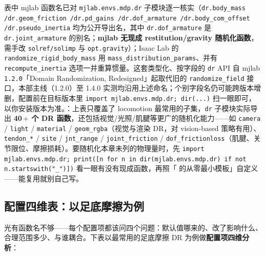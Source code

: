 \begin{finenote}
表中 mjlab 函数名已对 \texttt{mjlab.\allowbreak envs.\allowbreak mdp.\allowbreak dr} 子模块逐一核实（\texttt{dr.\allowbreak body\_mass /\allowbreak  dr.\allowbreak geom\_friction /\allowbreak  dr.\allowbreak pd\_gains /\allowbreak  dr.\allowbreak dof\_armature /\allowbreak  dr.\allowbreak body\_com\_offset /\allowbreak  dr.\allowbreak pseudo\_inertia} 均为公开导出名，其中 \texttt{dr.\allowbreak dof\_armature} 是 \texttt{dr.\allowbreak joint\_armature} 的别名；\textbf{mjlab 无现成 restitution/gravity 随机化函数}，需手改 \texttt{solref/\allowbreak solimp} 与 \texttt{opt.gravity}）；Isaac Lab 的 \texttt{randomize\_rigid\_body\_mass} 用 \texttt{mass\_distribution\_params}、并有 \texttt{recompute\_inertia} 选项一并重算惯量。这套类型化、按字段的 \texttt{dr} API 自 mjlab \texttt{1.2.0}「Domain Randomization, Redesigned」起取代旧的 \texttt{randomize\_field} 接口，本部主线（1.2.0）至 1.4.0 实测均沿用上述命名；个别字段名仍可能跨版本增删，配置前在目标版本里 \texttt{import mjlab.\allowbreak envs.\allowbreak mdp.\allowbreak dr; dir(...)} 扫一眼即可，以你安装版本为准。：上表只覆盖了 locomotion 最常用的子集，\texttt{dr} 子模块实际导出\textbf{ 40\,$+$ 个 DR 函数}，还包括视觉/光照/肌腱等更广的随机化能力——如 \texttt{camera} / \texttt{light} / \texttt{material} / \texttt{geom\_rgba}（视觉与渲染 DR，对 vision-based 策略有用）、\texttt{tendon\_*} / \texttt{site} / \texttt{jnt\_range} / \texttt{joint\_friction} / \texttt{dof\_frictionloss}（肌腱、关节限位、摩擦损耗）。要随机化本章未列的物理量时，先 \texttt{import mjlab.\allowbreak envs.\allowbreak mdp.\allowbreak dr; print([n for n in dir(mjlab.\allowbreak envs.\allowbreak mdp.\allowbreak dr) if not n.\allowbreak startswith("\_")])} 看一眼有没有现成函数，再照「 的从零最小模板」自定义——能复用就别自己写。
\end{finenote}

\subsection{配置四维表：以足底摩擦为例}
\label{sec:rlmc-dr-func-4d}

光有函数名不够——每个配置项都该问四个问题：默认值哪来的、改了影响什么、合理范围多少、与谁耦合。下表以最常用的足底摩擦 DR 为例做\textbf{配置项四维分析}：

